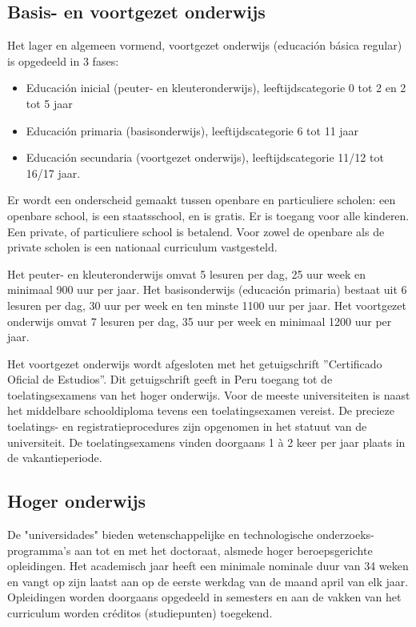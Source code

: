 \subsection{Basis- en voortgezet onderwijs}
Het lager en algemeen vormend, voortgezet onderwijs (educación básica regular) is opgedeeld in 3 fases:
 \begin{itemize}
\item Educación inicial (peuter- en kleuteronderwijs), leeftijdscategorie 0 tot 2 en 2 tot 5 jaar
\item Educación primaria (basisonderwijs), leeftijdscategorie 6 tot 11 jaar
\item Educación secundaria (voortgezet onderwijs), leeftijdscategorie 11/12 tot 16/17 jaar.
\end{itemize}
Er wordt een onderscheid gemaakt tussen openbare en particuliere scholen: een openbare school, is een staatsschool, en is gratis. Er is toegang voor alle kinderen. Een private, of particuliere school is betalend. Voor zowel de openbare als de private scholen is een nationaal curriculum vastgesteld. \autocite{Nuffic2015}

Het peuter- en kleuteronderwijs omvat 5 lesuren per dag, 25 uur week en minimaal 900 uur per jaar. Het basisonderwijs (educación primaria) bestaat uit 6 lesuren per dag, 30 uur per week en ten minste 1100 uur per jaar. Het voortgezet onderwijs omvat 7 lesuren per dag, 35 uur per week en minimaal 1200 uur per jaar. \autocite{Nuffic2015}

Het voortgezet onderwijs wordt afgesloten met het getuigschrift ''Certificado Oficial de Estudios''. Dit getuigschrift geeft in Peru toegang tot de toelatingsexamens van het hoger onderwijs. Voor de meeste universiteiten is naast het middelbare schooldiploma tevens een toelatingsexamen vereist. De precieze toelatings- en registratieprocedures zijn opgenomen in het statuut van de universiteit. De toelatingsexamens vinden doorgaans 1 à 2 keer per jaar plaats in de vakantieperiode. \autocite{Nuffic2015}

\subsection{Hoger onderwijs}
De "universidades" bieden wetenschappelijke en technologische onderzoeks-programma’s aan tot en met het doctoraat, alsmede hoger beroepsgerichte opleidingen. Het academisch jaar heeft een minimale nominale duur van 34 weken en vangt op zijn laatst aan op de eerste werkdag van de maand april van elk jaar. Opleidingen worden doorgaans opgedeeld in semesters en aan de vakken van het curriculum worden créditos (studiepunten) toegekend. \autocite{Nuffic2015}

